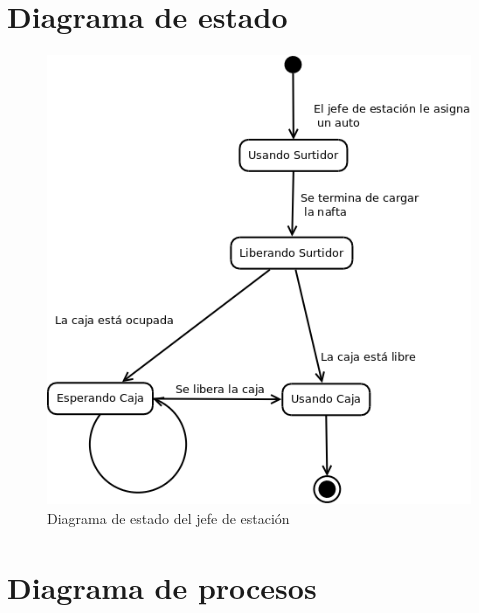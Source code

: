 \documentclass[12pt,a4paper,titlepage,oneside]{article}
\begin{document}
\section{Diagrama de estado}
\begin{figure}[hbtp]
\begin{center}
\includegraphics[scale=0.5]{diagrama_estado_empleado.png}
\end{center}
\caption[Long caption]{Diagrama de estado del jefe de estación}
\end{figure}

\section{Diagrama de procesos}
\end{document}
